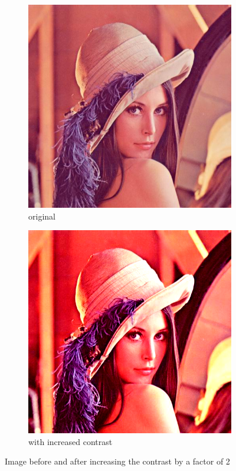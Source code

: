 \documentclass[12pt]{article}
\theoremstyle{definition}
\newcommand{\subfiguresize}{.3\textwidth}
\begin{document}
\begin{figure}[H]\centering
    \begin{subfigure}[t]{\subfiguresize}\centering
        \includegraphics[width=\textwidth]{lenac.png}
        \caption{original}
    \end{subfigure}
    \hspace{.05\textwidth}
    \begin{subfigure}[t]{\subfiguresize}\centering
        \includegraphics[width=\textwidth]{lenac_contrast_2x.png}
        \caption{with increased contrast}
    \end{subfigure}
    \caption{Image before and after increasing the contrast by a factor of 2}
\end{figure}
\end{document}

